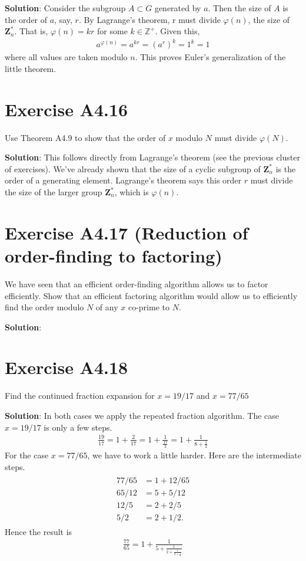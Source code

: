 \documentclass{book}
\begin{document}
    \textbf{Solution}: Consider the subgroup $A\subset G$ generated by $a$. Then the size of $A$ is the order of $a$, say, $r$. By Lagrange's theorem, r must divide $\varphi(n)$, the size of $\textbf{Z}_n^*$. That is, $\varphi(n) = k r$ for some $k\in\mathbb{Z}^+$. Given this,
    \begin{align}
        a^{\varphi(n)} = a^{kr} = (a^r)^k = 1^k = 1
    \end{align}
    where all values are taken modulo $n$. This proves Euler's generalization of the little theorem.

\section*{Exercise A4.16}
    Use Theorem A4.9 to show that the order of $x$ modulo $N$ must divide $\varphi(N)$.
    
    \textbf{Solution}: This follows directly from Lagrange's theorem (see the previous cluster of exercises). We've already shown that the size of a cyclic subgroup of $\textbf{Z}_n^*$ is the order of a generating element. Lagrange's theorem says this order $r$ must divide the size of the larger group $\textbf{Z}_n^*$, which is $\varphi(n)$.

\section*{Exercise A4.17 (Reduction of order-finding to factoring)}
    We have seen that an efficient order-finding algorithm allows us to factor efficiently. Show that an efficient factoring algorithm would allow us to efficiently find the order modulo $N$ of any $x$ co-prime to $N$.
    
    \textbf{Solution}:

\section*{Exercise A4.18}
    Find the continued fraction expansion for $x=19/17$ and $x=77/65$

    \textbf{Solution}: In both cases we apply the repeated fraction algorithm. The case $x=19/17$ is only a few steps.
    \begin{align}
        \frac{19}{17} = 1 + \frac{2}{17} = 1 + \frac{1}{\frac{17}{2}} = 1+\frac{1}{8+\frac{1}{2}} 
    \end{align}
    For the case $x=77/65$, we have to work a little harder. Here are the intermediate steps.
    \begin{align}
    \begin{aligned}
        77/65 &= 1 + 12/65 \\
        65/12 &= 5 + 5/12 \\
        12/5 &= 2 + 2/5 \\
        5/2 &= 2 + 1/2.
    \end{aligned}
    \end{align}
    Hence the result is
    \begin{align}
        \frac{77}{65} = 1 + \frac{1}{5 + \frac{1}{2+\frac{1}{2+\frac{1}{2}}}}
    \end{align}
\end{document}
